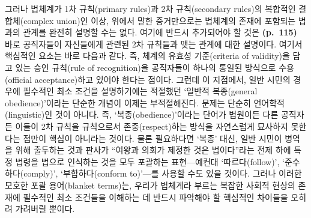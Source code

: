 그러나 법체계가 1차 규칙(primary rules)과 2차 규칙(secondary rules)의
복합적인 결합체(complex union)인 이상, 위에서 말한 증거만으로는 법체계의
존재에 포함되는 법과의 관계를 완전히 설명할 수는 없다. 여기에 반드시
추가되어야 할 것은 \textbf{(p.~115)} 바로 공직자들이 자신들에게 관련된
2차 규칙들과 맺는 관계에 대한 설명이다. 여기서 핵심적인 요소는 바로
다음과 같다. 즉, 체계의 유효성 기준(criteria of validity)을 담고 있는
승인 규칙(rule of recognition)을 공직자들이 하나의 통일된 방식으로
수용(official acceptance)하고 있어야 한다는 점이다. 그런데 이 지점에서,
일반 시민의 경우에 필수적인 최소 조건을 설명하기에는 적절했던 `일반적
복종(general obedience)'이라는 단순한 개념이 이제는 부적절해진다. 문제는
단순히 언어학적(linguistic)인 것이 아니다. 즉, `복종(obedience)'이라는
단어가 법원이든 다른 공직자든 이들이 2차 규칙을 규칙으로서
존중(respect)하는 방식을 자연스럽게 묘사하지 못한다는 점만이 핵심이
아니라는 것이다. 물론 필요하다면 `복종' 대신, 일반 시민이 병역을 위해
출두하는 것과 판사가 ``여왕과 의회가 제정한 것은 법이다''라는 전제 하에
특정 법령을 법으로 인식하는 것을 모두 포괄하는 표현---예컨대
`따르다(follow)', `준수하다(comply)', `부합하다(conform to)'---를 사용할
수도 있을 것이다. 그러나 이러한 모호한 포괄 용어(blanket terms)는,
우리가 법체계라 부르는 복잡한 사회적 현상의 존재에 필수적인 최소
조건들을 이해하는 데 반드시 파악해야 할 핵심적인 차이들을 오히려
가려버릴 뿐이다.

